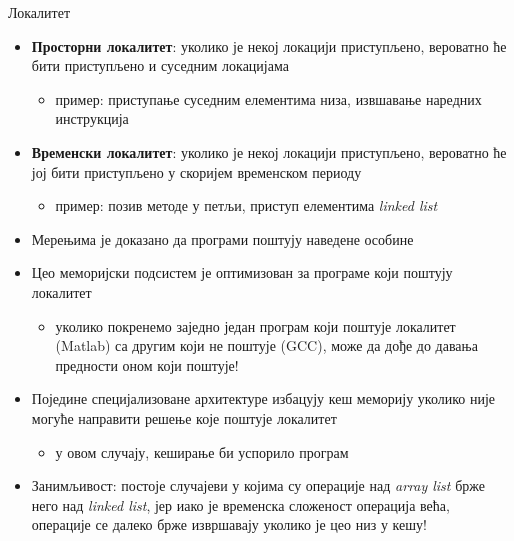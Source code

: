 \documentclass{beamer}
\begin{document}
    \begin{frame}[allowframebreaks]{Локалитет}
        \begin{itemize}
            \item \textbf{Просторни локалитет}: уколико је некој локацији приступљено, вероватно ће бити приступљено и суседним локацијама
            \begin{itemize}
                \item пример: приступање суседним елементима низа, извшавање наредних инструкција
            \end{itemize}
            \item \textbf{Временски локалитет}: уколико је некој локацији приступљено, вероватно ће јој бити приступљено у скоријем временском периоду
            \begin{itemize}
                \item пример: позив методе у петљи, приступ елементима \textit{linked list}
            \end{itemize}
            \item Мерењима је доказано да програми поштују наведене особине
        \end{itemize}
        
        \framebreak

        \begin{itemize} 
            \item Цео меморијски подсистем је оптимизован за програме који поштују локалитет
            \begin{itemize}
                \item уколико покренемо заједно један програм који поштује локалитет (Matlab) са другим који не поштује (GCC), може да дође до давања предности оном који поштује! 
            \end{itemize}
            \item Поједине специјализоване архитектуре избацују кеш меморију уколико није могуће направити решење које поштује локалитет
            \begin{itemize}
                \item у овом случају, кеширање би успорило програм
            \end{itemize}
            \item Занимљивост: постоје случајеви у којима су операције над \textit{array list} брже него над \textit{linked list}, јер иако је временска сложеност операција већа, операције се далеко брже извршавају уколико је цео низ у кешу!
        \end{itemize}
    \end{frame}
    
\end{document}
